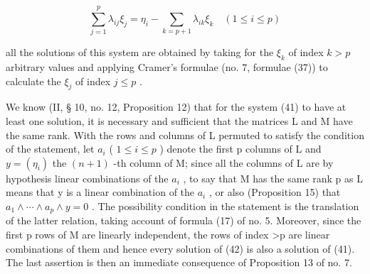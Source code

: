 \[
\sum_ {j = 1} ^ {p} \lambda_ {i j} \xi_ {j} = \eta_ {i} - \sum_ {k = p + 1} \lambda_ {i k} \xi_ {k} \quad (1 \leqslant i \leqslant p)\tag{42}
\]

all the solutions of this system are obtained by taking for the \(\xi_{k}\) of index \(k > p\) arbitrary values and applying Cramer's formulae (no. 7, formulae (37)) to calculate the \(\xi_{j}\) of index \(j \leqslant p\) .

We know (II, § 10, no. 12, Proposition 12) that for the system (41) to have at least one solution, it is necessary and sufficient that the matrices L and M have the same rank. With the rows and columns of L permuted to satisfy the condition of the statement, let \(a_{i}\) ( \(1 \leqslant i \leqslant p\) ) denote the first p columns of L and \(y = (\eta_{i})\) the \((n + 1)\) -th column of M; since all the columns of L are by hypothesis linear combinations of the \(a_{i}\) , to say that M has the same rank p as L means that y is a linear combination of the \(a_{i}\) , or also (Proposition 15) that \(a_{1} \wedge \cdots \wedge a_{p} \wedge y = 0\) . The possibility condition in the statement is the translation of the latter relation, taking account of formula (17) of no. 5. Moreover, since the first p rows of M are linearly independent, the rows of index \textgreater p are linear combinations of them and hence every solution of (42) is also a solution of (41). The last assertion is then an immediate consequence of Proposition 13 of no. 7.

